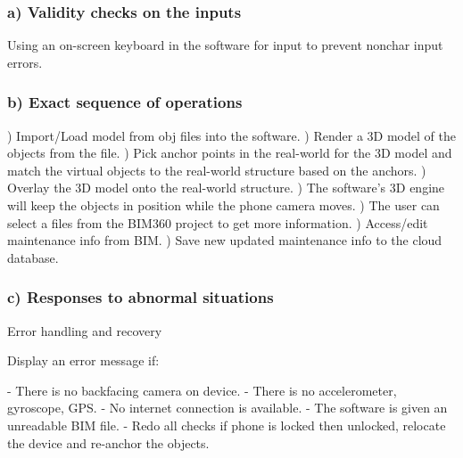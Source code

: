 \documentclass[onecolumn, draftclsnofoot,10pt, compsoc]{IEEEtran}
\begin{document}
        \subsubsection*{a) Validity checks on the inputs}
            \hangindent=10mm\noindent Using an on-screen keyboard in the software for input to prevent nonchar input errors. \par
            
        \subsubsection*{b) Exact sequence of operations} 
            \hangindent=10mm) Import/Load model from obj files into the software. ) Render a 3D model of the objects from the file. ) Pick anchor points in the real-world for the 3D model and match the virtual objects to the real-world structure based on the anchors. ) Overlay the 3D model onto the real-world structure. ) The software's 3D engine will keep the objects in position while the phone camera moves. ) The user can select a files from the BIM360 project to get more information. ) Access/edit maintenance info from BIM. ) Save new updated maintenance info to the cloud database. \par
        \subsubsection*{c) Responses to abnormal situations}
            \hangindent=10mm\noindent
            Error handling and recovery \par
            \hangindent=15mm\noindent
            Display an error message if: \par
            \hangindent=20mm\noindent
                    - There is no backfacing camera on device. \newline
                    - There is no accelerometer, gyroscope, GPS. \newline
                    - No internet connection is available. \newline
                    - The software is given an unreadable BIM file. \newline
                    - Redo all checks if phone is locked then unlocked, relocate the device and re-anchor the objects. \newline
             \par
\end{document}

